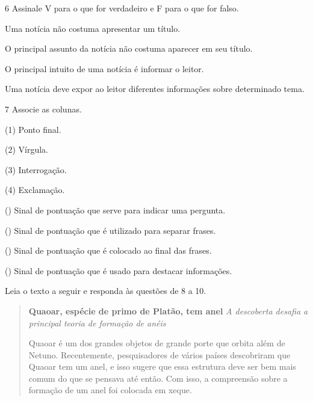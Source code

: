 \num{6} Assinale V para o que for verdadeiro e F para o que for falso.

\begin{boxlist}
\item Uma notícia não costuma apresentar um título. 

\item O principal assunto da notícia não costuma aparecer em seu título. 

\item O principal intuito de uma notícia é informar o leitor. 

\item Uma notícia deve expor ao leitor diferentes informações sobre 
determinado tema.
\end{boxlist}

\num{7} Associe as colunas.

\begin{multicols}{2}
(1) Ponto final.\medskip

(2) Vírgula.\medskip

(3) Interrogação.\medskip

(4) Exclamação.

\columnbreak

() Sinal de pontuação que serve para indicar uma pergunta. 

() Sinal de pontuação que é utilizado para separar frases. 

() Sinal de pontuação que é colocado ao final das frases. 

() Sinal de pontuação que é usado para destacar informações. 
\end{multicols}

Leia o texto a seguir e responda às questões de 8 a 10.

\begin{quote}
\textbf{Quaoar, espécie de primo de Platão, tem anel}
\textit{A descoberta desafia a principal teoria de formação de anéis}

Quaoar é um dos grandes objetos de grande porte que orbita além de Netuno.
Recentemente, pesquisadores de vários países descobriram que Quaoar tem um
anel, e isso sugere que essa estrutura deve ser bem mais comum do que se
pensava até então. Com isso, a compreensão sobre a formação de um anel
foi colocada em xeque.

\end{quote}

